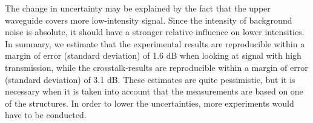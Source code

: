 The change in uncertainty may be explained by the fact that the upper waveguide covers more low-intensity signal. Since the intensity of background noise is absolute, it should have a stronger relative influence on lower intensities. \\


In summary, we estimate that the experimental results are reproducible within a margin of error (standard deviation) of 1.6 dB when looking at signal with high transmission, while the crosstalk-results are reproducible within a margin of error (standard deviation) of 3.1 dB. These estimates are quite pessimistic, but it is necessary when it is taken into account that the measurements are based on one of the structures. In order to lower the uncertainties, more experiments would have to be conducted.

